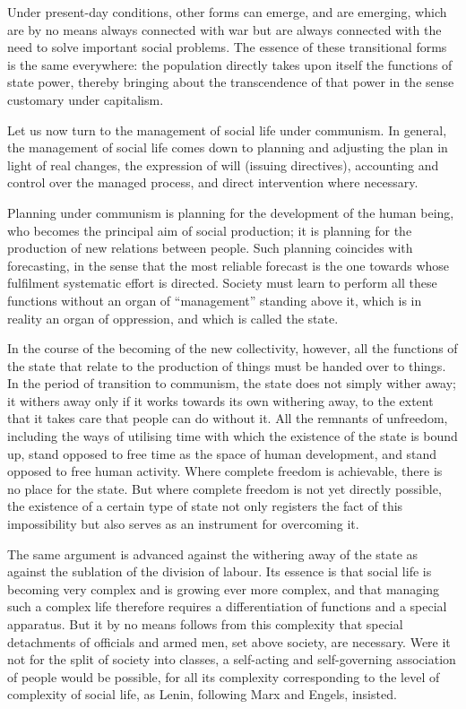 \documentclass[../main]{subfiles}
\begin{document}
Under present-day conditions, other forms can emerge, and are emerging, which are by no means always connected with war but are always connected with the need to solve important social problems. The essence of these transitional forms is the same everywhere: the population directly takes upon itself the functions of state power, thereby bringing about the transcendence of that power in the sense customary under capitalism.

Let us now turn to the management of social life under communism. In general, the management of social life comes down to planning and adjusting the plan in light of real changes, the expression of will (issuing directives), accounting and control over the managed process, and direct intervention where necessary.

Planning under communism is planning for the development of the human being, who becomes the principal aim of social production; it is planning for the production of new relations between people. Such planning coincides with forecasting, in the sense that the most reliable forecast is the one towards whose fulfilment systematic effort is directed. Society must learn to perform all these functions without an organ of “management” standing above it, which is in reality an organ of oppression, and which is called the state.

In the course of the becoming of the new collectivity, however, all the functions of the state that relate to the production of things must be handed over to things. In the period of transition to communism, the state does not simply wither away; it withers away only if it works towards its own withering away, to the extent that it takes care that people can do without it. All the remnants of unfreedom, including the ways of utilising time with which the existence of the state is bound up, stand opposed to free time as the space of human development, and stand opposed to free human activity. Where complete freedom is achievable, there is no place for the state. But where complete freedom is not yet directly possible, the existence of a certain type of state not only registers the fact of this impossibility but also serves as an instrument for overcoming it.

The same argument is advanced against the withering away of the state as against the sublation of the division of labour. Its essence is that social life is becoming very complex and is growing ever more complex, and that managing such a complex life therefore requires a differentiation of functions and a special apparatus. But it by no means follows from this complexity that special detachments of officials and armed men, set above society, are necessary. Were it not for the split of society into classes, a self-acting and self-governing association of people would be possible, for all its complexity corresponding to the level of complexity of social life, as Lenin, following Marx and Engels, insisted.
\end{document}
